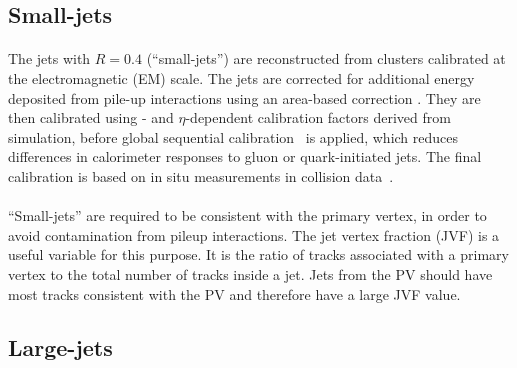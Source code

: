 \subsection{Small-\R jets}
\paragraph{}
The jets with $R=0.4$ (``small-\R jets'') are reconstructed from clusters calibrated at the electromagnetic (EM) scale. The jets are corrected for additional energy deposited from pile-up interactions using an area-based correction \cite{Cacciari:2008gn}. 
They are then calibrated using \pt- and $\eta$-dependent calibration factors derived from simulation, before global sequential calibration~\cite{Aad:2011he} is applied, which reduces differences in calorimeter responses to gluon or quark-initiated jets. 
The final calibration is based on in situ measurements in collision data~\cite{ATL-PHYS-PUB-2015-015}.

\paragraph{}
``Small-\R jets'' are required to be consistent with the primary vertex, in order to avoid contamination from pileup interactions. 
The jet vertex fraction (JVF) is a useful variable for this purpose. 
It is the ratio of tracks associated with a primary vertex to the total number of tracks inside a jet. 
Jets from the PV should have most tracks consistent with the PV and therefore have a large JVF value.

\subsection{Large-\R jets}
\label{obj:largeRjet}

